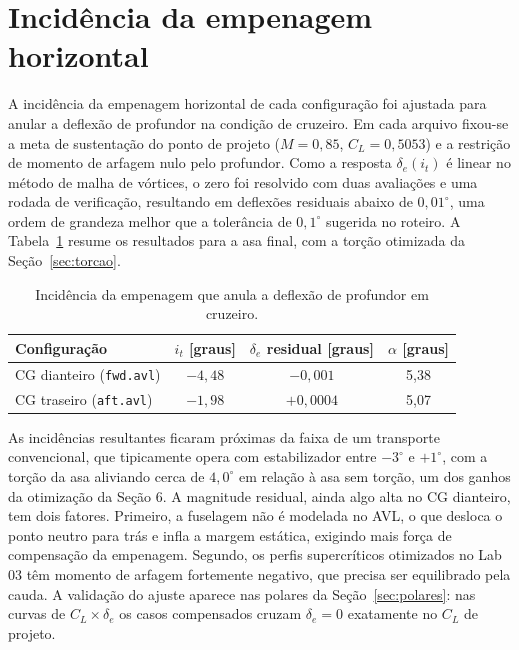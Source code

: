 \newpage
\section{Incidência da empenagem horizontal}

A incidência da empenagem horizontal de cada configuração foi ajustada para
anular a deflexão de profundor na condição de cruzeiro. Em cada arquivo
fixou-se a meta de sustentação do ponto de projeto ($M = 0{,}85$,
$C_L = 0{,}5053$) e a restrição de momento de arfagem nulo pelo profundor.
Como a resposta $\delta_e(i_t)$ é linear no método de malha de vórtices, o
zero foi resolvido com duas avaliações e uma rodada de verificação,
resultando em deflexões residuais abaixo de $0{,}01^\circ$, uma ordem de
grandeza melhor que a tolerância de $0{,}1^\circ$ sugerida no roteiro. A
Tabela~\ref{tab:trimagem} resume os resultados para a asa final, com a
torção otimizada da Seção~\ref{sec:torcao}.

\begin{table}[H]
\centering
\caption{Incidência da empenagem que anula a deflexão de profundor em cruzeiro.}\label{tab:trimagem}
\renewcommand{\arraystretch}{1.25}
\begin{tabular}{lccc}
\toprule
Configuração & $i_t$ [graus] & $\delta_e$ residual [graus] & $\alpha$ [graus] \\
\midrule
CG dianteiro (\texttt{fwd.avl}) & $-4{,}48$ & $-0{,}001$ & 5,38 \\
CG traseiro (\texttt{aft.avl}) & $-1{,}98$ & $+0{,}0004$ & 5,07 \\
\bottomrule
\end{tabular}
\end{table}

As incidências resultantes ficaram próximas da faixa de um transporte
convencional, que tipicamente opera com estabilizador entre $-3^\circ$ e
$+1^\circ$, com a torção da asa aliviando cerca de $4{,}0^\circ$ em
relação à asa sem torção, um dos ganhos da otimização da Seção 6. A
magnitude residual, ainda algo alta no CG dianteiro, tem dois fatores.
Primeiro, a fuselagem não é modelada no AVL, o que desloca o ponto neutro
para trás e infla a margem estática, exigindo mais força de compensação da
empenagem. Segundo, os perfis supercríticos otimizados no Lab 03 têm
momento de arfagem fortemente negativo, que precisa ser equilibrado pela
cauda. A validação do ajuste aparece nas polares da
Seção~\ref{sec:polares}: nas curvas de $C_L \times \delta_e$ os casos
compensados cruzam $\delta_e = 0$ exatamente no $C_L$ de projeto.
